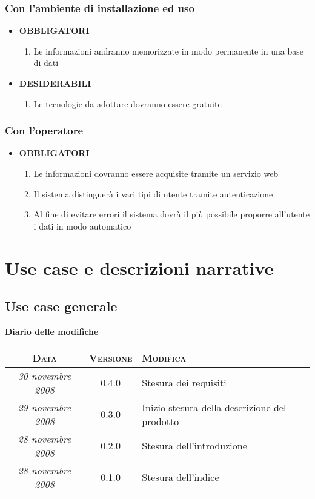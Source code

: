 \documentclass[11pt,a4paper]{article}
\newcommand{\modifiche} 
{
\newpage
\begin{center}
\textbf{Diario delle modifiche} \\
\bigskip
\begin{tabular}{|c|c|p{0.51\textwidth}|}
\hline
\textsc{Data} & \textsc{Versione} & \textsc{Modifica} \\
\hline
\hline
\textit{30 novembre 2008} & 0.4.0 & Stesura dei requisiti \\
\hline
\textit{29 novembre 2008} & 0.3.0 & Inizio stesura della descrizione del prodotto \\
\hline
\textit{28 novembre 2008} & 0.2.0 & Stesura dell'introduzione \\
\hline
\textit{28 novembre 2008} & 0.1.0 & Stesura dell'indice \\
\hline
\end{tabular}
\end{center}
}
\begin{document}
\subsubsection{Con l’ambiente di installazione ed uso}
\begin{itemize}
\item \textbf{OBBLIGATORI}
\begin{enumerate}
\item Le informazioni andranno memorizzate in modo permanente in una base di dati
\end{enumerate}
\item \textbf{DESIDERABILI}
\begin{enumerate}
\item Le tecnologie da adottare dovranno essere gratuite
\end{enumerate}
\end{itemize}
\subsubsection{Con l’operatore}
\begin{itemize}
\item \textbf{OBBLIGATORI}
\begin{enumerate}
\item Le informazioni dovranno essere acquisite tramite un servizio web
\item Il sistema distinguerà i vari tipi di utente tramite autenticazione
\item Al fine di evitare errori il sistema dovrà il più possibile proporre all'utente i dati in modo automatico
\end{enumerate}
\end{itemize}
\section{Use case e descrizioni narrative}
\subsection{Use case generale}
\modifiche
\end{document}
